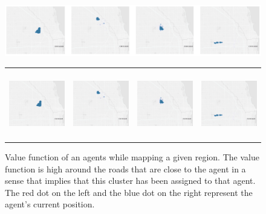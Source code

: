 \begin{figure}[t]
  \begin{center}
  \iflatexml
  \includegraphics[width=6\textwidth]{figs/heatmap_cluster.png}
  \else
    \begin{tabular}{llll}
      \includegraphics[height=3.0cm,trim={0.2cm 0 0.4cm 0},clip]{figs/clustered1.png} &
      \includegraphics[height=3.0cm,trim={0.2cm 0 0.8cm 0},clip]{figs/clustered2.png} &
      \includegraphics[height=3.0cm,trim={0.2cm 0 0.8cm 0},clip]{figs/clustered3.png} &
      \includegraphics[height=3.0cm,trim={0.0cm 0 0cm 0},clip]{figs/clustered4.png} \\
    \end{tabular}
  \fi
  \caption{Value function of an agents while mapping a given region.
  The value function is high around the roads that are close
  to the agent in a sense that implies that this cluster has been
  assigned to that agent. The red dot on the left and the blue dot
  on the right represent the agent's current position.}
  \label{fig:heatmap_cluster}
  \end{center}
  \vspace{-0.25in}
\end{figure}
